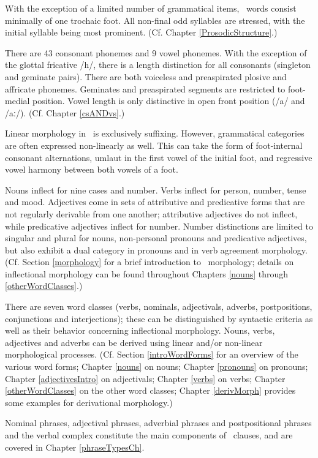 With the exception of a limited number of grammatical items, \PS\ words consist minimally of one trochaic foot. All non-final odd syllables are stressed, with the initial syllable being most prominent. (Cf. Chapter \ref{ProsodicStructure}.) 

There are 43 consonant phonemes and 9 vowel phonemes. With the exception of the glottal fricative /h/, there is a length distinction for all consonants (singleton and geminate pairs). There are both voiceless and preaspirated plosive and affricate phonemes. Geminates and preaspirated segments are restricted to foot-medial position. Vowel length is only distinctive in open front position (/a/ and /aː/). (Cf. Chapter \ref{csANDvs}.) 

Linear morphology in \PS\ is exclusively suffixing. However, grammatical categories are often expressed non-linearly as well. This can take the form of foot-internal consonant alternations, umlaut in the first vowel of the initial foot, and regressive vowel harmony between both vowels of a foot. 

Nouns inflect for nine cases and number. Verbs inflect for person, number, tense and mood. Adjectives come in sets of attributive and predicative forms that are not regularly derivable from one another; attributive adjectives do not inflect, while predicative adjectives inflect for number. Number distinctions are limited to singular and plural for nouns, non-personal pronouns and predicative adjectives, but also exhibit a dual category in pronouns and in verb agreement morphology. (Cf. Section \ref{morphology} for a brief introduction to \PS\ morphology; details on inflectional morphology can be found throughout Chapters \ref{nouns} through \ref{otherWordClasses}.) 

There are seven word classes (verbs, nominals, adjectivals, adverbs, postpositions, conjunctions and interjections); these can be distinguished by syntactic criteria as well as their behavior concerning inflectional morphology. Nouns, verbs, adjectives and adverbs can be derived using linear and/or non-linear morphological processes. (Cf. Section \ref{introWordForms} for an  overview of the various word forms; Chapter \ref{nouns} on nouns; Chapter \ref{pronouns} on pronouns; Chapter \ref{adjectivesIntro} on adjectivals; Chapter \ref{verbs} on verbs; Chapter \ref{otherWordClasses} on the other word classes; Chapter \ref{derivMorph} provides some examples for derivational morphology.) 

Nominal phrases, adjectival phrases, adverbial phrases and postpositional phrases and the verbal complex constitute the main components of \PS\ clauses, and are covered in Chapter \ref{phraseTypesCh}. 

